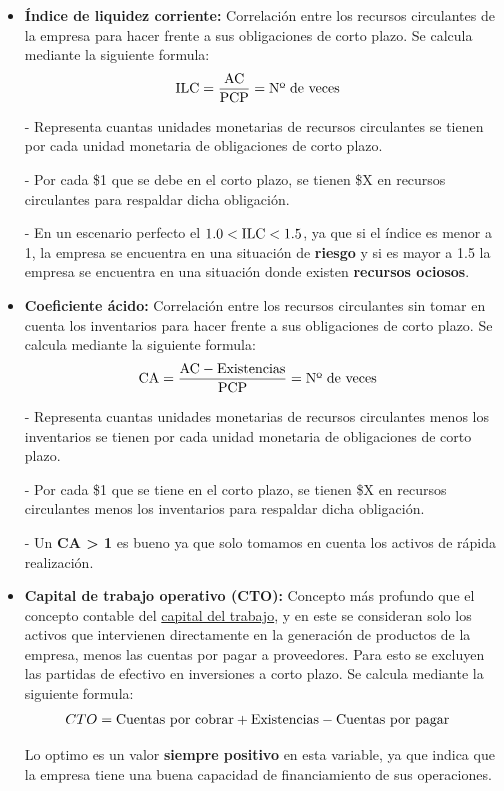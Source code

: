 \documentclass{templateNote}
\begin{document}
\begin{itemize}
    \item \textbf{Índice de liquidez corriente:} Correlación entre los recursos circulantes de la empresa para hacer frente a sus obligaciones de corto plazo. Se calcula mediante la siguiente formula:
    \begin{align*}
        \textnormal{ILC} &= \frac{\textnormal{AC}}{\textnormal{PCP}} = \textnormal{Nº de veces}
    \end{align*}
    
    - Representa cuantas unidades monetarias de recursos circulantes se tienen por cada
    unidad monetaria de obligaciones de corto plazo.

    - Por cada \$1 que se debe en el corto plazo, se tienen \$X en recursos circulantes para respaldar dicha
    obligación.

    - En un escenario perfecto el \textbf{$1.0 < \textnormal{ILC} < 1.5$}, ya que si el índice es menor a 1, la empresa
    se encuentra en una situación de \textbf{riesgo} y si es mayor a 1.5 la empresa se encuentra en una situación donde existen \textbf{recursos ociosos}.

    \item \textbf{Coeficiente ácido:} Correlación entre los recursos circulantes sin tomar en cuenta los inventarios para hacer frente a sus obligaciones de corto plazo. Se calcula mediante la siguiente formula:
    \begin{align*}
        \textnormal{CA} &= \frac{\textnormal{AC} - \textnormal{Existencias}}{\textnormal{PCP}} = \textnormal{Nº de veces}
    \end{align*} 

    - Representa cuantas unidades monetarias de recursos circulantes menos los inventarios se tienen por cada unidad monetaria de obligaciones de corto plazo.

    - Por cada \$1 que se tiene en el corto plazo, se tienen \$X en recursos circulantes menos los inventarios para respaldar dicha obligación.

    - Un \textbf{CA > 1} es bueno ya que solo tomamos en cuenta los activos de rápida realización.

    \item\textbf{Capital de trabajo operativo (CTO):}
    \noindent Concepto más profundo que el concepto contable del \hyperref[sec:Capital neto del trabajo (CNT)]{capital del trabajo}, y en este se consideran solo los activos que intervienen directamente
    en la generación de productos de la empresa, menos las cuentas por pagar a proveedores. Para esto se excluyen las partidas de efectivo en inversiones a corto plazo. Se calcula mediante la siguiente formula:
    \begin{align*}
        CTO &= \textnormal{Cuentas por cobrar} + \textnormal{Existencias} - \textnormal{Cuentas por pagar}
    \end{align*}

    \noindent Lo optimo es un valor \textbf{siempre positivo} en esta variable, ya que indica que la empresa tiene una buena capacidad de financiamiento de sus operaciones.

\end{itemize}
\end{document}
